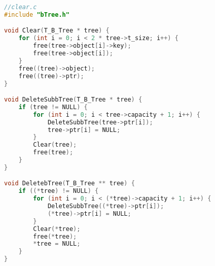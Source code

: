 \begin{lstlisting}[language=C]
//clear.c
#include "bTree.h"

void Clear(T_B_Tree * tree) {
    for (int i = 0; i < 2 * tree->t_size; i++) {
        free(tree->object[i]->key);
        free(tree->object[i]);
    }
    free((tree)->object);
    free((tree)->ptr);
}

void DeleteSubbTree(T_B_Tree * tree) {
    if (tree != NULL) {
        for (int i = 0; i < tree->capacity + 1; i++) {
            DeleteSubbTree(tree->ptr[i]);
            tree->ptr[i] = NULL;
        }
        Clear(tree);
        free(tree);
    }
}

void DeletebTree(T_B_Tree ** tree) {
    if ((*tree) != NULL) {
        for (int i = 0; i < (*tree)->capacity + 1; i++) {
            DeleteSubbTree((*tree)->ptr[i]);
            (*tree)->ptr[i] = NULL;
        }
        Clear(*tree);
        free(*tree);
        *tree = NULL;
    }
}
\end{lstlisting}

